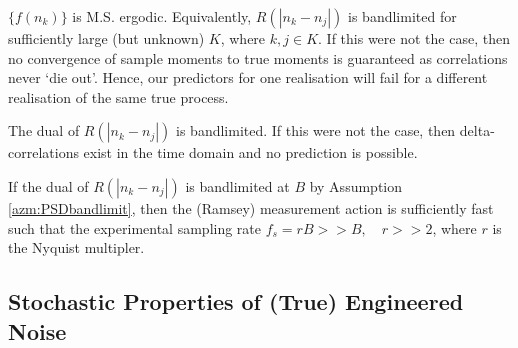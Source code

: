 \begin{azm} \label{azm:Rbandlimit}
	$\{f(n_k)\}$ is M.S. ergodic. Equivalently, $R(|n_k - n_j|)$ is bandlimited for sufficiently large (but unknown) $K$, where $k,j \in K$. If this were not the case, then no convergence of sample moments to true moments is guaranteed as correlations never `die out'. Hence, our predictors for one realisation will fail for a different realisation of the same true process. 
\end{azm}

\begin{azm}\label{azm:PSDbandlimit}
	The dual of $R(|n_k - n_j|)$ is bandlimited. If this were not the case, then delta-correlations exist in the time domain and no prediction is possible. 
\end{azm}

\begin{azm}\label{azm:fastmsmtaction}
	If the dual of $R(|n_k - n_j|)$ is bandlimited at $B$ by Assumption \ref{azm:PSDbandlimit}, then the (Ramsey) measurement action is sufficiently fast such that the experimental sampling rate $f_s = rB >> B, \quad r >> 2$, where $r$ is the Nyquist multipler.
\end{azm}

\subsection{Stochastic Properties of (True) Engineered Noise}

